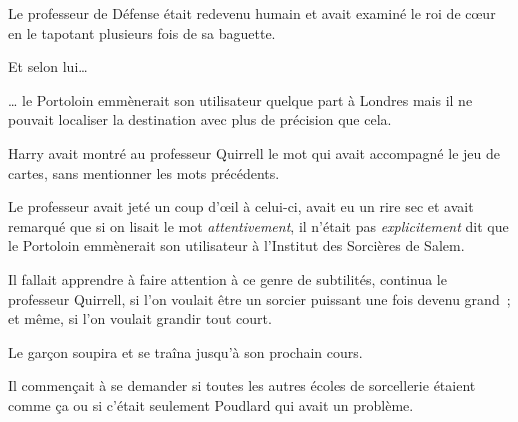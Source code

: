 Le professeur de Défense était redevenu humain et avait examiné le roi de cœur en le tapotant plusieurs fois de sa baguette.

Et selon lui…

… le Portoloin emmènerait son utilisateur quelque part à Londres mais il ne pouvait localiser la destination avec plus de précision que cela.

Harry avait montré au professeur Quirrell le mot qui avait accompagné le jeu de cartes, sans mentionner les mots précédents.

Le professeur avait jeté un coup d'œil à celui-ci, avait eu un rire sec et avait remarqué que si on lisait le mot \emph{attentivement}, il n'était pas \emph{explicitement} dit que le Portoloin emmènerait son utilisateur à l'Institut des Sorcières de Salem.

Il fallait apprendre à faire attention à ce genre de subtilités, continua le professeur Quirrell, si l'on voulait être un sorcier puissant une fois devenu grand~; et même, si l'on voulait grandir tout court.

Le garçon soupira et se traîna jusqu'à son prochain cours.

Il commençait à se demander si toutes les autres écoles de sorcellerie étaient comme ça ou si c'était seulement Poudlard qui avait un problème.
